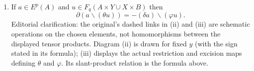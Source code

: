 \documentclass[../main]{subfiles}
\begin{document}
\begin{theorem}
\begin{enumerate}
If $u \in E^p(X \times Y, A \times B)$ and $y \in F_q(Y, B)$, then \[\delta((i^\ast u)/y) = (-1)^{p + 1} (j^\ast u)/(\partial y).\]

\item[(iii)]
 {
}

If $a \in E^p(A)$ and $u \in F_q(A \times Y \cup X \times B)$ then \[\partial(a \backslash (\theta u)) = -(\delta a) \backslash (\varphi u).\]
\noindent Editorial clarification: the original's dashed links in (ii) and (iii) are schematic operations on the chosen elements, not homomorphisms between the displayed tensor products. Diagram (ii) is drawn for fixed $y$ (with the sign stated in its formula); (iii) displays the actual restriction and excision maps defining $\theta$ and $\varphi$. Its slant-product relation is the formula above.


\end{enumerate}
\end{theorem}
\end{document}
